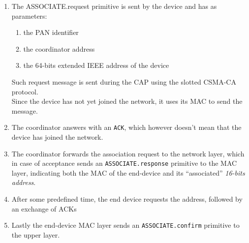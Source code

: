 \begin{paracol}{2}
   \begin{enumerate}
      \item The ASSOCIATE.request primitive is sent by the device and has as parameters:
      \begin{enumerate}
         \item the PAN identifier
         \item the coordinator address
         \item the 64-bits extended IEEE address of the device
      \end{enumerate}
      Such request message is sent during the CAP using the slotted CSMA-CA protocol.\\
      Since the device has not yet joined the network, it uses its MAC to send the message.
      \item The coordinator answers with an \texttt{ACK}, which however doesn't mean that the device has joined the network.
      \item The coordinator forwards the association request to the network layer, which in case of acceptance sends an \texttt{ASSOCIATE.response} primitive to the MAC layer, indicating both the MAC of the end-device and its ``associated'' \textit{16-bits address}.
      \item After some predefined time, the end device requests the address, followed by an exchange of ACKs
      \item Lastly the end-device MAC layer sends an \texttt{ASSOCIATE.confirm} primitive to the upper layer.
   \end{enumerate}
   
   \switchcolumn
   

\end{paracol}
